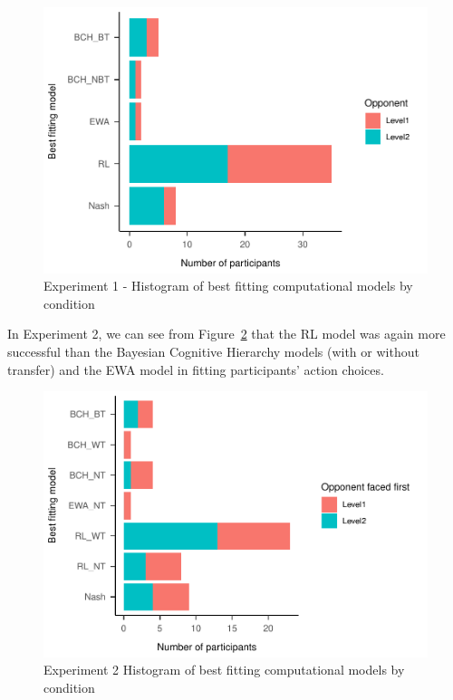 \documentclass[english,man,floatsintext]{apa6}
\begin{document}
\begin{figure}

{\centering \includegraphics[width=\textwidth]{paper_draft_2021_files/figure-latex/exp1-comp-models-1} 

}

\caption{Experiment 1 - Histogram of best fitting computational models by condition}\label{fig:exp1-comp-models}
\end{figure}



In Experiment 2, we can see from Figure~\ref{fig:exp2-comp-models} that the RL model was again more successful than the Bayesian Cognitive Hierarchy models (with or without transfer) and the EWA model in fitting participants' action choices.

\begin{figure}

{\centering \includegraphics[width=\textwidth]{paper_draft_2021_files/figure-latex/exp2-comp-models-1} 

}

\caption{Experiment 2 Histogram of best fitting computational models by condition}\label{fig:exp2-comp-models}
\end{figure}
\end{document}
